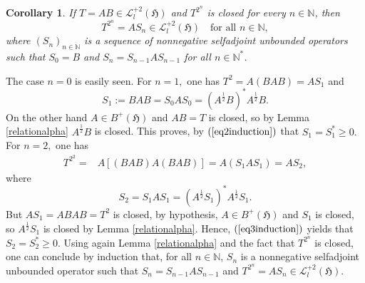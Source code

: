 \documentclass{amsart}
\makeatletter
\newtheorem{corollary}[theorem]{Corollary}
\newcommand{\h}{\mathfrak{H}}
\newcommand{\adj}{^*}
\newcommand{\half}{^{\frac{1}{2}}}
\newcommand{\N}{\mathbb{N}}%
\newcommand{\lplus}{B^{+}(\h)}
\newcommand{\ldeux}{\mathcal{L}_l^{+2}(\h)}
\numberwithin{equation}{section}
\renewenvironment{proof}[1][\proofname]{%
   \par\pushQED{\qed}\normalfont%
   \topsep6\p@\@plus6\p@\relax
   \trivlist\item[\hskip\labelsep\bfseries#1\@addpunct{.}]%
   \ignorespaces
}{%
   \popQED\endtrivlist\@endpefalse
}
\makeatother
\begin{document}

     \begin{corollary}
        If $T=AB\in \ldeux$ and $T^{2^n}$  is closed for every $n\in \N$, then
        \begin{equation}\label{eq1induction}
          T^{2^n} = A S_n\in \ldeux \quad \text{for all } n \in \N,
        \end{equation}
        where $(S_n)_{n \in \N}$  is a sequence of nonnegative selfadjoint unbounded operators such that
        $S_0 =B$ and
         $S_{n}= S_{n-1} A  S_{n-1}$ for all   $n \in \N\adj$.
      \end{corollary}
    \begin{proof}
 The case $n=0$ is easily seen.  For $n=1,$ one has $T^2= A (BAB)=A S_1$ and
               \begin{equation}\label{eq2induction}
                   S_1:=BAB= S_0 A S_0= (A\half B)\adj A\half B.
                \end{equation}
 On the other hand $A \in \lplus$ and $AB=T$ is closed, so by Lemma \ref{relationalpha} $A\half B$ is closed. This proves, by $(\ref{eq2induction})$ that $S_1= S_1\adj \geq 0.$ \\
  \hspace*{0.3cm} For $n=2,$ one has
  \begin{align*}
    T^{2^2}= & A [ (B AB) A(B AB) ] = A ( S_1 A S_1)= A S_2,
  \end{align*}
  where
   \begin{equation}\label{eq3induction}
     S_2= S_1 A S_1= (A\half S_1)\adj A\half S_1.
   \end{equation}
     But $ A S_1= AB AB= T^2$ is closed, by hypothesis, $A \in \lplus$ and $S_1$ is closed, so       $A\half S_1$ is closed by Lemma \ref{relationalpha}. Hence, $(\ref{eq3induction}) $ yields that  $S_2= S_2^* \geq 0$. Using again Lemma \ref{relationalpha} and the fact that $T^{2^n}$  is closed, one can conclude by induction that, for all $n \in \N$,  $S_n$ is a nonnegative selfadjoint unbounded  operator such that $S_n= S_{n-1} A S_{n-1}$ and $T^{2^{n}}= A S_n \in \ldeux.$
    \end{proof}
\end{document}
